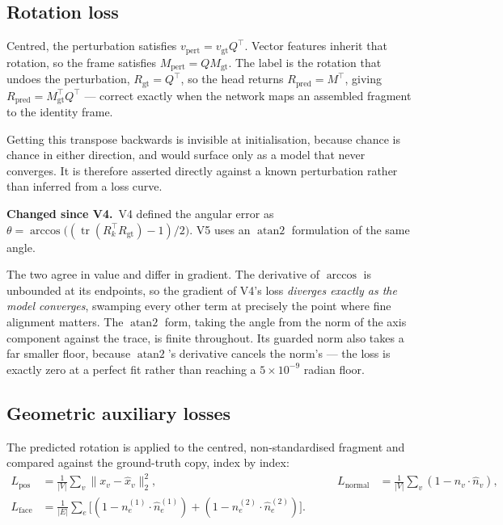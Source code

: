 \documentclass[11pt,a4paper]{report}
\newcommand{\change}[1]{\par\vspace{2pt}\noindent\textcolor{soft}{\small\textbf{Changed since V4.}\ #1}\par\vspace{2pt}}
\begin{document}
\subsection{Rotation loss}
\label{sub:rotloss}

Centred, the perturbation satisfies $v_{\text{pert}} = v_{\text{gt}} Q^{\top}$.
Vector features inherit that rotation, so the frame satisfies
$M_{\text{pert}} = Q M_{\text{gt}}$. The label is the rotation that undoes the
perturbation, $R_{\text{gt}} = Q^{\top}$, so the head returns
$R_{\text{pred}} = M^{\top}$, giving
$R_{\text{pred}} = M_{\text{gt}}^{\top} Q^{\top}$ --- correct exactly when the
network maps an assembled fragment to the identity frame.

Getting this transpose backwards is invisible at initialisation, because chance
is chance in either direction, and would surface only as a model that never
converges. It is therefore asserted directly against a known perturbation rather
than inferred from a loss curve.

\change{V4 defined the angular error as
$\theta = \arccos\big((\operatorname{tr}(R_k^{\top}R_{\text{gt}})-1)/2\big)$.
V5 uses an $\operatorname{atan2}$ formulation of the same angle.}

The two agree in value and differ in gradient. The derivative of $\arccos$ is
unbounded at its endpoints, so the gradient of V4's loss \emph{diverges exactly
as the model converges}, swamping every other term at precisely the point where
fine alignment matters. The $\operatorname{atan2}$ form, taking the angle from
the norm of the axis component against the trace, is finite throughout. Its
guarded norm also takes a far smaller floor, because $\operatorname{atan2}$'s
derivative cancels the norm's --- the loss is exactly zero at a perfect fit
rather than reaching a $5\times10^{-9}$ radian floor.

\subsection{Geometric auxiliary losses}
\label{sub:aux}

The predicted rotation is applied to the centred, non-standardised fragment and
compared against the ground-truth copy, index by index:
\[
\begin{aligned}
L_{\text{pos}} &= \frac{1}{|V|}\sum_{v} \lVert x_v - \hat{x}_v \rVert_2^2,
&\qquad
L_{\text{normal}} &= \frac{1}{|V|}\sum_{v} (1 - n_v \cdot \hat{n}_v), \\
L_{\text{face}} &= \frac{1}{|E|}\sum_{e} \Big[(1 - n^{(1)}_e \cdot \hat{n}^{(1)}_e) + (1 - n^{(2)}_e \cdot \hat{n}^{(2)}_e)\Big] .
\end{aligned}
\]
\end{document}
